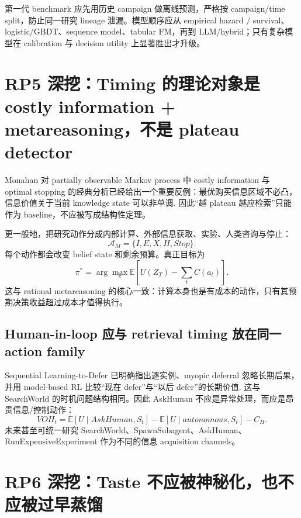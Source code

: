 \documentclass[11pt,a4paper]{ctexart}
\newcommand{\E}{\mathbb{E}}
\newcommand{\A}{\mathcal{A}}
\begin{document}
第一代 benchmark 应先用历史 campaign 做离线预测，严格按 campaign/time split，防止同一研究 lineage 泄漏。模型顺序应从 empirical hazard / survival、logistic/GBDT、sequence model、tabular FM，再到 LLM/hybrid；只有复杂模型在 calibration 与 decision utility 上显著胜出才升级。

\section{RP5 深挖：Timing 的理论对象是 costly information + metareasoning，不是 plateau detector}

Monahan 对 partially observable Markov process 中 costly information 与 optimal stopping 的经典分析已经给出一个重要反例：最优购买信息区域不必凸，信息价值关于当前 knowledge state 可以非单调\parencite{monahan1980costly}. 因此“越 plateau 越应检索”只能作为 baseline，不应被写成结构性定理。

更一般地，把研究动作分成内部计算、外部信息获取、实验、人类咨询与停止：
\begin{equation}
\A_M=\{I,E,X,H,Stop\}.
\end{equation}
每个动作都会改变 belief state 和剩余预算。真正目标为
\begin{equation}
\pi^*=\arg\max_\pi\E[U(Z_T)-\sum_t C(a_t)].
\end{equation}
这与 rational metareasoning 的核心一致：计算本身也是有成本的动作，只有其预期决策收益超过成本才值得执行\parencite{russell1991metareasoning}。

\subsection{Human-in-loop 应与 retrieval timing 放在同一 action family}

Sequential Learning-to-Defer 已明确指出逐实例、myopic deferral 忽略长期后果，并用 model-based RL 比较“现在 defer”与“以后 defer”的长期价值\parencite{joshi2021sequentialdefer}. 这与 SearchWorld 的时机问题结构相同。因此 AskHuman 不应是异常处理，而应是昂贵信息/控制动作：
\begin{equation}
VOH_t=\E[U\mid AskHuman,S_t]-\E[U\mid autonomous,S_t]-C_H.
\end{equation}
未来甚至可统一研究 SearchWorld、SpawnSubagent、AskHuman、RunExpensiveExperiment 作为不同的信息 acquisition channels。

\section{RP6 深挖：Taste 不应被神秘化，也不应被过早蒸馏}
\end{document}

